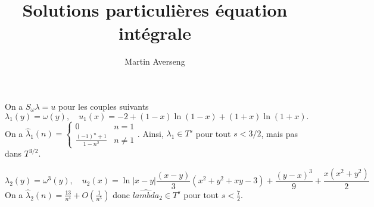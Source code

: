 \documentclass[]{article}
\title{Solutions particulières équation intégrale}
\author{Martin Averseng}
\begin{document}
	\maketitle
	On a $S_\omega \lambda = u$ pour les couples suivants 
	\begin{equation}
		\lambda_1(y) = \omega(y), \quad u_1(x) = -2 + (1-x) \ln(1-x) + (1 + x) \ln(1+x).
	\end{equation}
	On a $\hat{\lambda}_1(n) = \begin{cases}
	0 & n = 1 \\
	\frac{(-1)^n + 1}{1 - n^2} & n \neq 1
	\end{cases}$. Ainsi, $\lambda_1 \in T^s$ pour tout $s < 3/2$, mais pas dans $T^{3/2}$. 
	
	\begin{equation}
		\lambda_2(y) = \omega^3(y), \quad u_2(x) = \ln|x-y|\frac{(x-y)}{3}(x^2 + y^2 + xy - 3) + \frac{(y-x)^3}{9} + \frac{x(x^2 + y^2)}{2}
	\end{equation}
	On a $\hat{\lambda}_2(n) = \frac{13}{n^4} + O\left(\frac{1}{n^5}\right)$ donc $\hat{lambda}_2 \in T^s$ pour tout $s < \frac{7}{2}$. 
	
	
\end{document}
